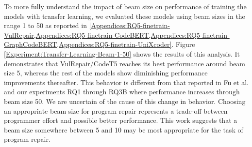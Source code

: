 To more fully understand the impact of beam size on performance of training the models with transfer learning, we evaluated these models using beam sizes in the range 1 to 50 as reported in \cref{Appendices:RQ5-finetrain-VulRepair,Appendices:RQ5-finetrain-CodeBERT,Appendices:RQ5-finetrain-GraphCodeBERT,Appendices:RQ5-finetrain-UniXcoder}.
Figure \ref{Experiment:Transfer-Learning-Beam-1-50} shows the results of this analysis.
It demonstrates that VulRepair/CodeT5 reaches its best performance around beam size 5, whereas the rest of the models show diminishing performance improvements thereafter.
This behavior is different from that reported in Fu et al.\cite{fu2022vulrepair} and our experiments RQ1 through RQ3B where performance increases through beam size 50.
We are uncertain of the cause of this change in behavior.
Choosing an appropriate beam size for program repair represents a trade-off between programmer effort and possible better performance.
This work suggests that a beam size somewhere between 5 and 10 may be most appropriate for the task of program repair.



